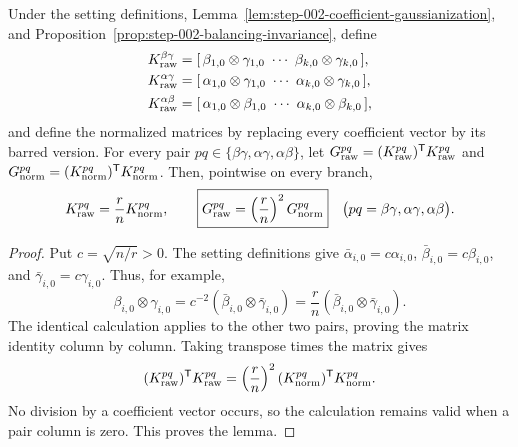 \begin{lemma}
\label{lem:step-005-pair-gram-scaling}
Under the setting definitions, Lemma~\ref{lem:step-002-coefficient-gaussianization}, and Proposition~\ref{prop:step-002-balancing-invariance}, define
\[
\begin{aligned}
  K_{\rm raw}^{\beta\gamma}
    &=[\,\beta_{1,0}\otimes\gamma_{1,0}\ \cdots\
          \beta_{k,0}\otimes\gamma_{k,0}\,],\\
  K_{\rm raw}^{\alpha\gamma}
    &=[\,\alpha_{1,0}\otimes\gamma_{1,0}\ \cdots\
          \alpha_{k,0}\otimes\gamma_{k,0}\,],\\
  K_{\rm raw}^{\alpha\beta}
    &=[\,\alpha_{1,0}\otimes\beta_{1,0}\ \cdots\
          \alpha_{k,0}\otimes\beta_{k,0}\,],
\end{aligned}
\]
and define the normalized matrices by replacing every coefficient vector by
its barred version. For every pair
\(pq\in\{\beta\gamma,\alpha\gamma,\alpha\beta\}\), let
\(G_{\rm raw}^{pq}=(K_{\rm raw}^{pq})^{\mathsf T}K_{\rm raw}^{pq}\) and
\(G_{\rm norm}^{pq}=(K_{\rm norm}^{pq})^{\mathsf T}K_{\rm norm}^{pq}\).
Then, pointwise on every branch,
\[
  K_{\rm raw}^{pq}=\frac rn K_{\rm norm}^{pq},
  \qquad
  \boxed{G_{\rm raw}^{pq}=\left(\frac rn\right)^2G_{\rm norm}^{pq}}
  \quad
  \bigl(pq=\beta\gamma,\alpha\gamma,\alpha\beta\bigr).
\]

\end{lemma}

\begin{proof}
Put \(c=\sqrt{n/r}>0\). The setting definitions
give \(\bar\alpha_{i,0}=c\alpha_{i,0}\),
\(\bar\beta_{i,0}=c\beta_{i,0}\), and
\(\bar\gamma_{i,0}=c\gamma_{i,0}\). Thus, for example,
\[
  \beta_{i,0}\otimes\gamma_{i,0}
  =c^{-2}(\bar\beta_{i,0}\otimes\bar\gamma_{i,0})
  =\frac rn(\bar\beta_{i,0}\otimes\bar\gamma_{i,0}).
\]
The identical calculation applies to the other two pairs, proving the matrix
identity column by column. Taking transpose times the matrix gives
\[
  (K_{\rm raw}^{pq})^{\mathsf T}K_{\rm raw}^{pq}
  =\left(\frac rn\right)^2
    (K_{\rm norm}^{pq})^{\mathsf T}K_{\rm norm}^{pq}.
\]
No division by a coefficient vector occurs, so the calculation remains valid
when a pair column is zero. This proves the lemma. 

\end{proof}


